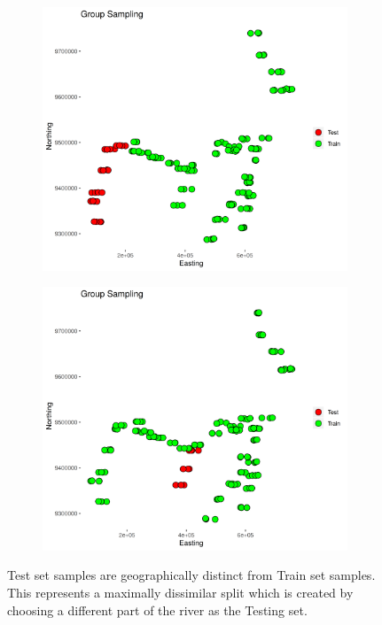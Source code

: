 \begin{figure}[h]
\centering
\begin{subfigure}{0.4\textwidth}
\includegraphics[width = \textwidth]{groupsamp.png}
\end{subfigure}
\begin{subfigure}{0.4\textwidth}
\includegraphics[width = \textwidth]{groupsamp2.png}
\end{subfigure}
\caption{Test set samples are geographically distinct from Train set samples. This represents a maximally dissimilar split which is created by choosing a different part of the river as the Testing set.}
\label{fig:groupsamp}
\end{figure}




